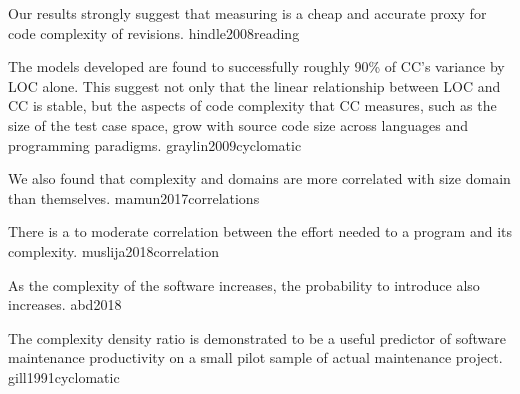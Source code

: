\documentclass{article}
\begin{document}
  {Our results strongly suggest that measuring  is a cheap and accurate proxy for code complexity of revisions.}
  {hindle2008reading}

  {The models developed are found to successfully  roughly 90\% of CC's variance by LOC alone. This suggest not only that the linear relationship between LOC and CC is stable, but the aspects of code complexity that CC measures, such as the size of the test case space, grow  with source code size across languages and programming paradigms.}
  {graylin2009cyclomatic}

  {We also found that complexity and  domains are more correlated with size domain than themselves.}
  {mamun2017correlations}

  {There is a  to moderate correlation between the effort needed to  a program and its complexity.}
  {muslija2018correlation}

  {As the complexity of the software increases, the probability to introduce  also increases.}
  {abd2018}


  {The complexity density ratio is demonstrated to be a useful predictor of software maintenance productivity on a small pilot sample of actual maintenance project.}
  {gill1991cyclomatic}


\end{document}
